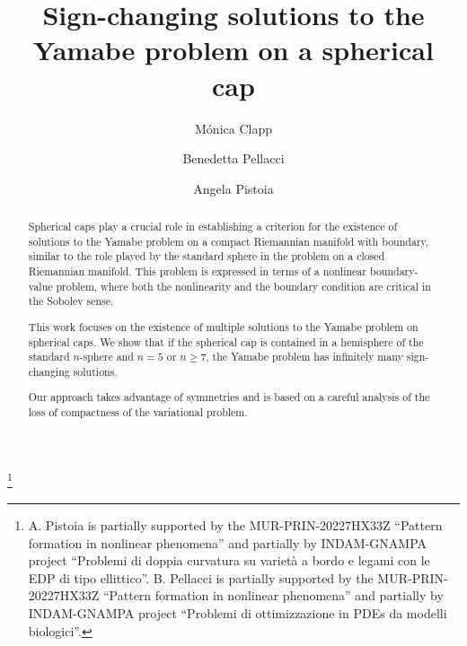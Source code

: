 \documentclass[reqno,11pt,oneside]{amsart}
\numberwithin{equation}{section}
\begin{document}
\title[Sign-changing solutions to the Yamabe problem on a spherical cap]
{Sign-changing solutions to the  Yamabe problem on a spherical cap}


\author{Mónica Clapp}
\address[Mónica Clapp]{Instituto de Matemáticas,
Universidad Nacional Autónoma de México,
Campus Juriquilla,
76230 Querétaro, Qro., Mexico}

\author{Benedetta Pellacci}
\address[Benedetta Pellacci]{Dipartimento di Matematica e Fisica,
Universit\`a della Campania ``Luigi Vanvitelli'',
Viale Lincoln 5,
81100 Caserta, Italy}

\author{Angela Pistoia}
\address[Angela Pistoia]{Dipartimento SBAI, Sapienza Universit\`a di Roma,
via Antonio Scarpa 16, 00161 Roma, Italy }


\thanks{A. Pistoia  is partially supported by  the MUR-PRIN-20227HX33Z
  ``Pattern formation in nonlinear phenomena'' and  partially by
  INDAM-GNAMPA project ``Problemi di doppia curvatura su variet\`a a
  bordo e legami con le EDP di tipo ellittico''. 
 B. Pellacci is partially supported by  the MUR-PRIN-20227HX33Z
  ``Pattern formation in nonlinear phenomena'' and  partially by
  INDAM-GNAMPA project ``Problemi di ottimizzazione in PDEs da modelli biologici''.}



\begin{abstract}
Spherical caps play a crucial role in establishing a criterion for the existence of solutions to the Yamabe problem on a compact Riemannian manifold with boundary, similar to the role played by the standard sphere in the problem on a closed Riemannian manifold. This problem is expressed in terms of a nonlinear boundary-value problem, where both the nonlinearity and the boundary condition are critical in the Sobolev sense.

This work focuses on the existence of multiple solutions to the Yamabe problem on spherical caps. We show that if the spherical cap is contained in a hemisphere of the standard $n$-sphere and $n = 5$ or $n \geq 7$, the Yamabe problem has infinitely many sign-changing solutions.

Our approach takes advantage of symmetries and is based on a careful analysis of the loss of compactness of the variational problem.
\end{abstract}
\end{document}
